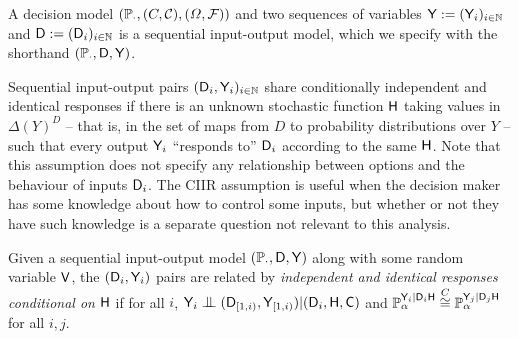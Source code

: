 \begin{definition}\label{def:seq_io}
A decision model $(\mathbb{P}_{\cdot}, (C,\mathcal{C}), (\Omega,\mathcal{F}))$ and two sequences of variables $\mathsf{Y}:=(\mathsf{Y}_i)_{i\in \mathbb{N}}$ and $\mathsf{D}:=(\mathsf{D}_i)_{i\in\mathbb{N}}$ is a sequential input-output model, which we specify with the shorthand $(\mathbb{P}_\cdot,\mathsf{D},\mathsf{Y})$.
\end{definition}

Sequential input-output pairs $(\mathsf{D}_i,\mathsf{Y}_i)_{i\in \mathbb{N}}$ share conditionally independent and identical responses if there is an unknown stochastic function $\mathsf{H}$ taking values in $\Delta(Y)^D$ -- that is, in the set of maps from $D$ to probability distributions over $Y$ -- such that every output $\mathsf{Y}_i$ ``responds to'' $\mathsf{D}_i$ according to the same $\mathsf{H}$. Note that this assumption does not specify any relationship between options and the behaviour of inputs $\mathsf{D}_i$. The CIIR assumption is useful when the decision maker has some knowledge about how to control some inputs, but whether or not they have such knowledge is a separate question not relevant to this analysis.

\begin{definition}\label{def:cii_rf}
Given a sequential input-output model $(\mathbb{P}_\cdot,\mathsf{D},\mathsf{Y})$ along with some random variable $\mathsf{V}$, the $(\mathsf{D}_i,\mathsf{Y}_i)$ pairs are related by \emph{independent and identical responses conditional on} $\mathsf{H}$ if for all $i$, $\RV{Y}_i\CI (\RV{D}_{[1,i)},\RV{Y}_{[1,i)})|(\RV{D}_i,\RV{H},\RV{C})$ and $\mathbb{P}_\alpha^{\mathsf{Y}_i|\mathsf{D}_i\mathsf{H}}\overset{C}{\cong}\mathbb{P}_\alpha^{\mathsf{Y}_j|\mathsf{D}_j\mathsf{H}}$ for all $i,j$.
\end{definition}



